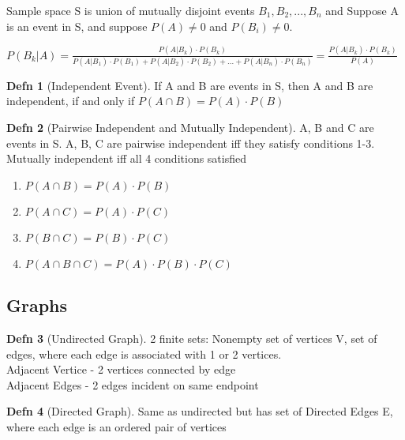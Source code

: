 \documentclass[a4paper]{article}
\theoremstyle{definition}
\newtheorem*{defn}{Defn}
\newenvironment{theorem}[1]
  {\renewcommand\theinnertheorem{#1}\innertheorem}
  {\endinnertheorem}
\begin{document}
\begin{theorem}{9.9.1}[Bayes' Theorem]
  Sample space S is union of mutually disjoint events $B_1,B_2,...,B_n$ and 
  Suppose A is an event in S, and suppose $P(A) \not = 0$ and $P(B_i) \not = 0$. 

  $P(B_k|A) = \frac{P(A|B_k) \cdot P(B_k)}{P(A|B_1)\cdot P(B_1)+ P(A|B_2)\cdot P(B_2) + ... + P(A|B_n)\cdot P(B_n)} = \frac{P(A|B_k)\cdot P(B_k)}{P(A)}$
\end{theorem}

\begin{defn}[Independent Event] If A and B are events in S, then A and B are independent, if and only if $P(A \cap B) = P(A) \cdot P(B)$
\end{defn}

\begin{defn}[Pairwise Independent and Mutually Independent] A, B and C are events in S. A, B, C are pairwise independent iff they satisfy conditions 1-3. Mutually independent iff all 4 conditions satisfied

  \begin{enumerate}
    \item $P(A \cap B) = P(A) \cdot P(B)$
    \item $P(A \cap C) = P(A) \cdot P(C)$
    \item $P(B \cap C) = P(B) \cdot P(C)$
    \item $P(A \cap B \cap C) = P(A) \cdot P(B) \cdot P(C)$
  \end{enumerate}

\end{defn}

\subsection*{Graphs}

\begin{defn}[Undirected Graph] 2 finite sets: Nonempty set of vertices V, set of edges, where each edge is associated with 1 or 2 vertices. \\
Adjacent Vertice - 2 vertices connected by edge\\
Adjacent Edges - 2 edges incident on same endpoint
\end{defn}

\begin{defn}[Directed Graph] Same as undirected but has set of Directed Edges E, where each edge is an ordered pair of vertices \end{defn}
\end{document}
